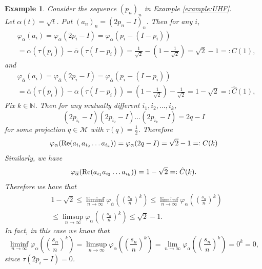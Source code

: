 \documentclass[a4paper,12pt]{amsart}
\newtheorem{example}[definition]{Example}
\newcommand{\M}{\mathcal{M}}
\newcommand{\N}{\mathbb{N}}
\begin{document}
\begin{example} \rm
Consider the sequence $(p_n)_n$ in Example \ref{example:UHF}.  \\
Let $\alpha(t) ={\sqrt t}$.  Put $(a_n)_n = (2p_n - I)_n$.  Then for any $i$, 
\begin{align*}
&\varphi_{\alpha}(a_i) = \varphi_{\alpha}(2p_i - I) = \varphi_{\alpha}(p_i - (I-p_i)) \\
&= \alpha(\tau(p_i)) - \overline{\alpha}(\tau(I -p_i)) = \frac{1}{\sqrt 2} - (1-\frac{1}{\sqrt 2} )  = {\sqrt 2} -1 =:C(1), 
\end{align*}
and 
\begin{align*}
&\varphi_{\overline{\alpha}}(a_i) = \varphi_{\overline{\alpha}}(2p_i - I) = \varphi_{\overline{\alpha}}(p_i - (I-p_i)) \\
&= \overline{\alpha}(\tau(p_i)) - {\alpha}(\tau(I-p_i))
 = (1-\frac{1}{\sqrt 2} ) - \frac{1}{\sqrt 2} = 1 -{\sqrt 2}  =:\hat{C}(1), 
\end{align*}
Fix $k \in  \N$. Then for any mutually different $i_1, i_2, \dots, i_k$, 
\[
(2p_{i_1}-I)(2p_{i_2}-I) \dots (2p_{i_k}-I) = 2q - I
\]
for some projection $q \in \M$ with $\tau(q) = \frac{1}{2}$.  
Therefore 
$$
\varphi_{\alpha}({\rm Re} (a_{i_1}a_{i_2} \dots a_{i_k}) ) = \varphi_{\alpha}(2q - I) = {\sqrt 2} -1 =:C(k)
$$
Similarly, we have 
$$
\varphi_{\overline{\alpha}}({\rm Re} (a_{i_1}a_{i_2} \dots a_{i_k}) ) = 1 -{\sqrt 2}  =:\hat{C}(k).
$$
Therefore  we have that
\begin{align*}
& 1- \sqrt {2} \leq \liminf _{n \to \infty}  \varphi_{\overline{\alpha}}((\frac{s_n}{n})^k) 
\leq \liminf _{n \to \infty}  \varphi_{\alpha}((\frac{s_n}{n})^k)\\ 
& \leq  \limsup _{n \to \infty}  \varphi_{\alpha}((\frac{s_n}{n})^k) \leq {\sqrt 2} -1 . 
\end{align*}
In fact, in this case we know that 
\[
\liminf _{n \to \infty}  \varphi_{\alpha}((\frac{s_n}{n})^k) =  \limsup _{n \to \infty}  \varphi_{\alpha}((\frac{s_n}{n})^k)
= \lim  _{n \to \infty}  \varphi_{\alpha}((\frac{s_n}{n})^k) = 0^k = 0, 
\]
since $\tau(2p_i - I) = 0$. 
\end{example}
\end{document}
